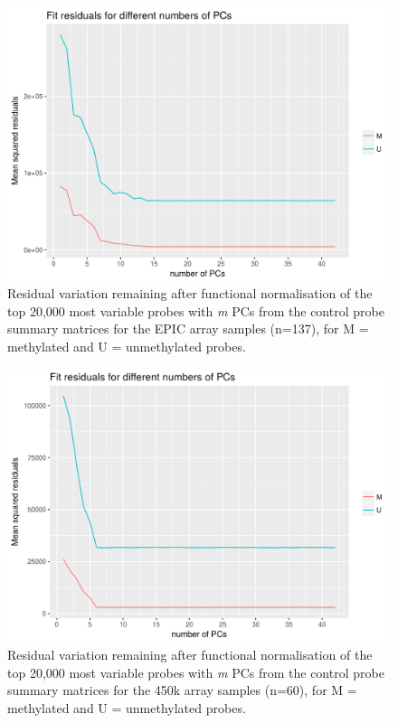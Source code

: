 \documentclass[]{book}
\begin{document}
\begin{figure}

{\centering \includegraphics[width=0.8\linewidth]{figs/MAVIDOSfunnormPCsEPICMonApr162018} 

}

\caption{Residual variation remaining after functional normalisation of the top 20,000 most variable probes with \emph{m} PCs from the control probe summary matrices for the EPIC array samples (n=137), for M = methylated and U = unmethylated probes.}\label{fig:MAVIDOSfunnormPCsEPICMonApr162018}
\end{figure}



\begin{figure}

{\centering \includegraphics[width=0.8\linewidth]{figs/MAVIDOSfunnormPCs450kMonApr162018} 

}

\caption{Residual variation remaining after functional normalisation of the top 20,000 most variable probes with \emph{m} PCs from the control probe summary matrices for the 450k array samples (n=60), for M = methylated and U = unmethylated probes.}\label{fig:MAVIDOSfunnormPCs450kMonApr162018}
\end{figure}
\end{document}
